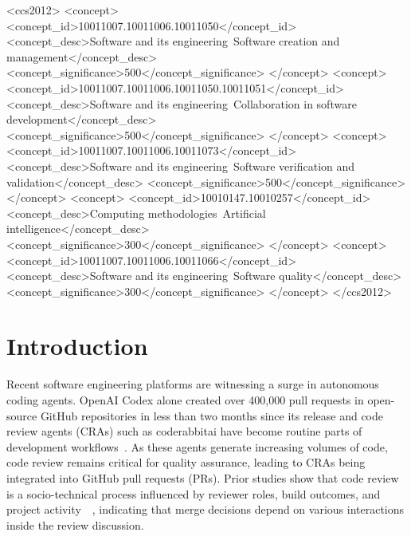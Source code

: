 \documentclass[sigconf]{acmart}
\begin{document}
\begin{CCSXML}
<ccs2012>
<concept>
<concept_id>10011007.10011006.10011050</concept_id>
<concept_desc>Software and its engineering~Software creation and management</concept_desc>
<concept_significance>500</concept_significance>
</concept>
<concept>
<concept_id>10011007.10011006.10011050.10011051</concept_id>
<concept_desc>Software and its engineering~Collaboration in software development</concept_desc>
<concept_significance>500</concept_significance>
</concept>
<concept>
<concept_id>10011007.10011006.10011073</concept_id>
<concept_desc>Software and its engineering~Software verification and validation</concept_desc>
<concept_significance>500</concept_significance>
</concept>
<concept>
<concept_id>10010147.10010257</concept_id>
<concept_desc>Computing methodologies~Artificial intelligence</concept_desc>
<concept_significance>300</concept_significance>
</concept>
<concept>
<concept_id>10011007.10011006.10011066</concept_id>
<concept_desc>Software and its engineering~Software quality</concept_desc>
<concept_significance>300</concept_significance>
</concept>
</ccs2012>
\end{CCSXML}





\maketitle

\vspace{-7.75pt}
\section{Introduction}

Recent software engineering platforms are witnessing a surge in autonomous coding agents. OpenAI Codex alone created over 400,000 pull requests in open-source GitHub repositories in less than two months since its release and code review agents (CRAs) such as coderabbitai have become routine parts of development workflows~\cite{Li_2025_SE3}. As these agents generate increasing volumes of code, code review remains critical for quality assurance, leading to CRAs being integrated into GitHub pull requests (PRs). Prior studies show that code review is a socio-technical process influenced by reviewer roles, build outcomes, and project activity~\cite{EcosystemPR_2024}~\cite{PREmpirical_2021}, indicating that merge decisions depend on various interactions inside the review discussion.
\end{document}
